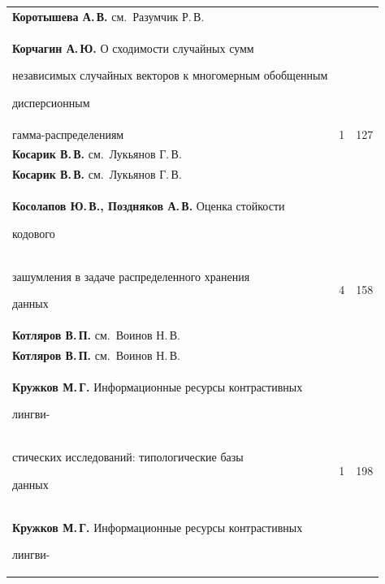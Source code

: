 {\begin{tabular}{p{317.5pt}rr}
\textbf{Коротышева А.\,В.} см.\ Разумчик Р.\,В.&&\\[1pt]


\hangindent=21pt\noindent\textbf{Корчагин А.\,Ю.} О сходимости случайных сумм


независимых случайных векторов к многомерным обобщенным


дисперсионным\linebreak


\\[-12pt]


\hspace*{21pt}гамма-распределениям&1&127\\[1pt]


\textbf{Косарик В.\,В.} см.\ Лукьянов Г.\,В.&&\\[1pt]


\textbf{Косарик В.\,В.} см.\ Лукьянов Г.\,В.&&\\[1pt]


\textbf{Косолапов Ю.\,В., Поздняков А.\,В.} Оценка стойкости


кодового\linebreak


\\[-12pt]


\hspace*{21pt}зашумления в задаче распределенного хранения


данных&4&158\\[1pt]


\textbf{Котляров В.\,П.} см.\ Воинов Н.\,В.&&\\[1pt]


\textbf{Котляров В.\,П.} см.\ Воинов Н.\,В.&&\\[1pt]


\textbf{Кружков М.\,Г.} Информационные ресурсы контрастивных


лингви-\linebreak


\\[-12pt]


\hspace*{21pt}стических исследований: типологические базы


данных&1&198\\[1pt]


\textbf{Кружков М.\,Г.} Информационные ресурсы контрастивных


лингви-\linebreak


\\[-12pt]



\end{tabular}}
